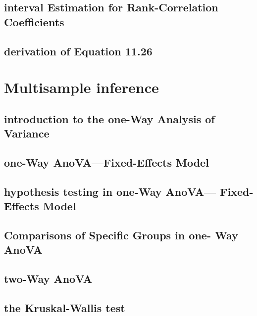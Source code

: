 \documentclass[12pt,]{article}
\theoremstyle{definition}
\theoremstyle{definition}
\theoremstyle{definition}
\theoremstyle{remark}
\begin{document}
\subsection{interval Estimation for Rank-Correlation
Coefficients}\label{interval-estimation-for-rank-correlation-coefficients}

\subsection{derivation of Equation
11.26}\label{derivation-of-equation-11.26}

\section{Multisample inference}\label{multisample-inference}

\subsection{introduction to the one-Way Analysis of
Variance}\label{introduction-to-the-one-way-analysis-of-variance}

\subsection{one-Way AnoVA---Fixed-Effects
Model}\label{one-way-anovafixed-effects-model}

\subsection{hypothesis testing in one-Way AnoVA--- Fixed-Effects
Model}\label{hypothesis-testing-in-one-way-anova-fixed-effects-model}

\subsection{Comparisons of Specific Groups in one- Way
AnoVA}\label{comparisons-of-specific-groups-in-one--way-anova}

\subsection{two-Way AnoVA}\label{two-way-anova}

\subsection{the Kruskal-Wallis test}\label{the-kruskal-wallis-test}
\end{document}
